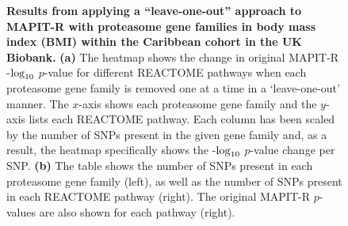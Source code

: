 \documentclass[10pt]{article}
\def\log{{\rm log}}
\begin{document}
\begin{figure}[H]
{\begin{tabular}{|cc|ccc|}
  \hline
\end{tabular}}
\caption{\textbf{Results from applying a ``leave-one-out'' approach to MAPIT-R with proteasome gene families in body mass index (BMI) within the Caribbean cohort in the UK Biobank.} \textbf{(a)} The heatmap shows the change in original MAPIT-R -$\log_{10}$ $p$-value for different REACTOME pathways when each proteasome gene family is removed one at a time in a `leave-one-out' manner. The $x$-axis shows each proteasome gene family and the $y$-axis lists each REACTOME pathway. Each column has been scaled by the number of SNPs present in the given gene family and, as a result, the heatmap specifically shows the -$\log_{10}$ $p$-value change per SNP. \textbf{(b)} The table shows the number of SNPs present in each proteasome gene family (left), as well as the number of SNPs present in each REACTOME pathway (right). The original MAPIT-R $p$-values are also shown for each pathway (right).}
\label{InterPath-Supp-Figure-Prot-Heatplots-Caribbean}
\end{figure}
\clearpage
\end{document}
